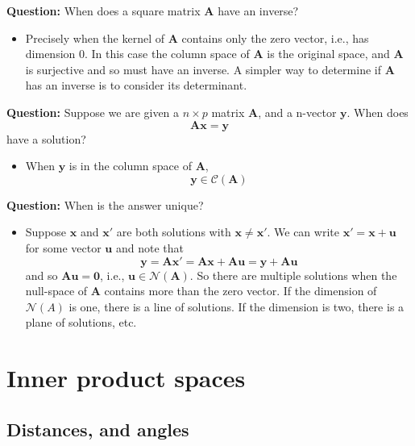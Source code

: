 \documentclass[
]{book}
\providecommand{\tightlist}{%
  \setlength{\itemsep}{0pt}\setlength{\parskip}{0pt}}
\theoremstyle{definition}
\theoremstyle{definition}
\theoremstyle{definition}
\theoremstyle{definition}
\theoremstyle{remark}
\begin{document}
\textbf{Question:} When does a square matrix \(\mathbf A\) have an inverse?

\begin{itemize}
\tightlist
\item
  Precisely when the kernel of \(\mathbf A\) contains only the zero vector, i.e., has dimension 0. In this case the column space of \(\mathbf A\) is the original space, and \(\mathbf A\) is surjective and so must have an inverse. A simpler way to determine if \(\mathbf A\) has an inverse is to consider its determinant.
\end{itemize}

\textbf{Question:} Suppose we are given a \(n\times p\) matrix \(\mathbf A\), and a n-vector \(\mathbf y\). When does
\[\mathbf A\mathbf x= \mathbf y\]
have a solution?

\begin{itemize}
\tightlist
\item
  When \(\mathbf y\) is in the column space of \(\mathbf A\),
  \[\mathbf y\in \mathcal{C}(\mathbf A)\]
\end{itemize}

\textbf{Question:} When is the answer unique?

\begin{itemize}
\tightlist
\item
  Suppose \(\mathbf x\) and \(\mathbf x'\) are both solutions with \(\mathbf x\not =\mathbf x'\). We can write \(\mathbf x'=\mathbf x+\mathbf u\) for some vector \(\mathbf u\) and note that
  \[\mathbf y=\mathbf A\mathbf x' = \mathbf A\mathbf x+\mathbf A\mathbf u= \mathbf y+\mathbf A\mathbf u\]
  and so \(\mathbf A\mathbf u={\boldsymbol 0}\), i.e., \(\mathbf u\in \mathcal{N}(\mathbf A)\). So there are multiple solutions when the null-space of \(\mathbf A\) contains more than the zero vector. If the dimension of \(\mathcal{N}(A)\) is one, there is a line of solutions. If the dimension is two, there is a plane of solutions, etc.
\end{itemize}

\hypertarget{linalg-innerprod}{%
\section{Inner product spaces}\label{linalg-innerprod}}

\hypertarget{normed}{%
\subsection{Distances, and angles}\label{normed}}
\end{document}
